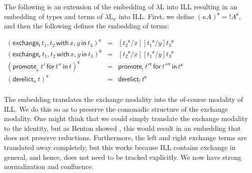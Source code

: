 \documentclass{llncs}
\newcommand{\Lnt}[1]{\mathit{#1}}
\newcommand{\Lmv}[1]{\mathit{#1}}
\newcommand{\Lsym}[1]{#1}
\begin{document}
\begin{definition}
  \label{def:embed-lambda-L!-in-ILL}
  The following is an extension of the embedding of $\lambda\text{L}$
  into ILL resulting in an embedding of types and terms of
  $\lambda\text{L}_\kappa$ into ILL.  First, we define $ \Lsym{(}   \kappa  \Lnt{A}   \Lsym{)} ^{\mathsf{e} }  =
   !    \Lnt{A} ^{\mathsf{e} }   $, and then the following defines the embedding of
  terms:
  \begin{center} \small
    \begin{math}
      \begin{array}{rlllllllllllllllllll}        
          (   \mathsf{exchange_l}\, \Lnt{t_{{\mathrm{1}}}} , \Lnt{t_{{\mathrm{2}}}} \,\mathsf{with}\, \Lmv{x} , \Lmv{y} \,\mathsf{in}\, \Lnt{t_{{\mathrm{3}}}}   )  ^{\mathsf{e} }  & = & \Lsym{[}   \Lnt{t_{{\mathrm{2}}}} ^{\mathsf{e} }   \Lsym{/}  \Lmv{x}  \Lsym{]}  \Lsym{[}   \Lnt{t_{{\mathrm{1}}}} ^{\mathsf{e} }   \Lsym{/}  \Lmv{y}  \Lsym{]}    \Lnt{t_{{\mathrm{3}}}} ^{\mathsf{e} }  \\
          (   \mathsf{exchange_r}\, \Lnt{t_{{\mathrm{1}}}} , \Lnt{t_{{\mathrm{2}}}} \,\mathsf{with}\, \Lmv{x} , \Lmv{y} \,\mathsf{in}\, \Lnt{t_{{\mathrm{3}}}}   )  ^{\mathsf{e} }  & = & \Lsym{[}   \Lnt{t_{{\mathrm{2}}}} ^{\mathsf{e} }   \Lsym{/}  \Lmv{x}  \Lsym{]}  \Lsym{[}   \Lnt{t_{{\mathrm{1}}}} ^{\mathsf{e} }   \Lsym{/}  \Lmv{y}  \Lsym{]}    \Lnt{t_{{\mathrm{3}}}} ^{\mathsf{e} }  \\
          (   \mathsf{promote}_\kappa\, \Lnt{t'} \,\mathsf{for}\, \Lnt{t''} \,\mathsf{in}\, \Lnt{t}   )  ^{\mathsf{e} }  & = &  \mathsf{promote}_!\,  \Lnt{t'} ^{\mathsf{e} }  \,\mathsf{for}\,  \Lnt{t''} ^{\mathsf{e} }  \,\mathsf{in}\,   \Lnt{t} ^{\mathsf{e} }   \\
          (   \mathsf{derelict}_\kappa\, \Lnt{t}   )  ^{\mathsf{e} }  & = &  \mathsf{derelict}_!\,   \Lnt{t} ^{\mathsf{e} }   \\
      \end{array}
    \end{math}
  \end{center}
\end{definition}

The embedding translates the exchange modality into the of-course
modality of ILL.  We do this so as to preserve the comonadic structure
of the exchange modality.  One might think that we could simply
translate the exchange modality to the identity, but as Benton showed
\cite{Benton:1995c}, this would result in an embedding that does not
preserve reductions.  Furthermore, the left and right exchange terms
are translated away completely, but this works because ILL contains
exchange in general, and hence, does not need to be tracked
explicitly.  We now have strong normalization and confluence.
\end{document}
